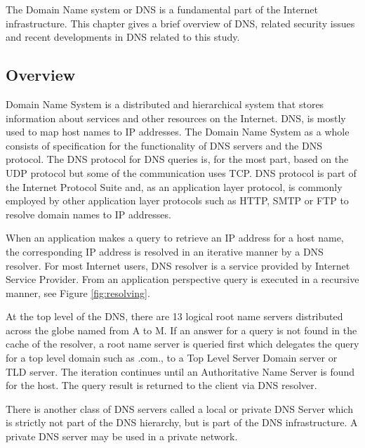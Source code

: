 The Domain Name system or DNS \cite{RFC1035}\cite{RFC1034} is a fundamental part of the Internet infrastructure. This chapter gives a brief overview of DNS, related security issues and recent developments in DNS related to this study.

\subsection{Overview}
Domain Name System is a distributed and hierarchical system that stores information about services and other resources on the Internet. DNS, is mostly used to map host names to IP addresses. The Domain Name System as a whole consists of specification for the functionality of DNS servers and the DNS protocol. The DNS protocol for DNS queries is, for the most part, based on the UDP protocol but some of the communication uses TCP. DNS protocol is part of the Internet Protocol Suite and, as an application layer protocol, is commonly employed by other application layer protocols such as HTTP, SMTP or FTP to resolve domain names to IP addresses. \citep{kurose_ross}\cite{tanenbaum} 

When an application makes a query to retrieve an IP address for a host name, the corresponding IP address is resolved in an iterative manner by a DNS resolver. For most Internet users, DNS resolver is a service provided by Internet Service Provider. From an application perspective query is executed in a recursive manner, see Figure \ref{fig:resolving}.  

At the top level of the DNS, there are 13 logical root name servers distributed across the globe named from A to M. If an answer for a query is not found in the cache of the resolver, a root name server is queried first which delegates the query for a top level domain such as .com., to a Top Level Server Domain server or \textsf{TLD} server. The iteration continues until an Authoritative Name Server is found for the host. The query result is returned to the client via DNS resolver. \citep{kurose_ross} \cite{tanenbaum} 

There is another class of DNS servers called a local or private DNS Server which is strictly not part of the DNS hierarchy, but is part of the DNS infrastructure. A private DNS server may be used in a private network. \citep{kurose_ross}


